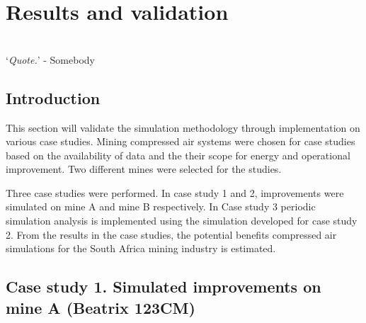 \chapter{Results and validation}
\thispagestyle{empty}
\vspace{38em}
\hrulefill
\\
\enquote*{\textit{Quote.}} - Somebody\\
\newpage
\section{Introduction}
This section will validate the simulation methodology through implementation on various case studies. Mining compressed air systems were chosen for case studies based on the availability of data and the their scope for energy and operational improvement. Two different mines were selected for the studies. 
\par 
Three case studies were performed. In case study 1 and 2, improvements were simulated on mine A and mine B respectively. In Case study 3 periodic simulation analysis is implemented using the simulation developed for case study 2. From the results in the case studies, the potential benefits compressed air simulations for the South Africa mining industry is estimated.

\section{Case study 1. Simulated improvements on mine A  \tiny{\color{blue}(Beatrix 123CM)}}
